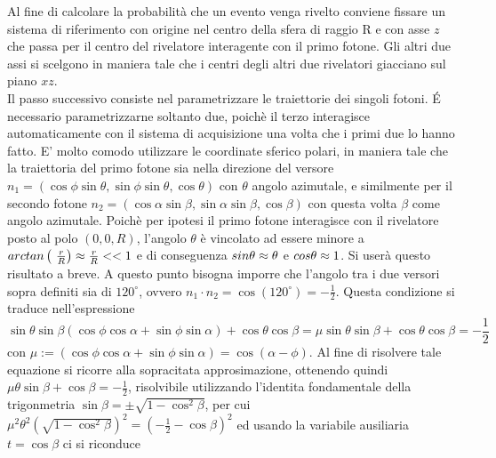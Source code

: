   Al fine di calcolare la probabilità che un evento venga rivelto conviene fissare un sistema di riferimento con origine nel centro della sfera di raggio R
  e con asse \(z\) che passa per il centro del rivelatore interagente con il primo fotone. Gli altri due assi si scelgono in maniera tale che i centri degli altri due rivelatori
  giacciano sul piano \(xz\).\\
  
  

  Il passo successivo consiste nel parametrizzare le traiettorie dei singoli fotoni. \'E necessario parametrizzarne soltanto due, poichè il terzo interagisce automaticamente con il
  sistema di acquisizione una volta che i primi due lo hanno fatto. E' molto comodo utilizzare le coordinate sferico polari, in maniera tale che la traiettoria del primo fotone sia 
  nella direzione del versore \(n_1 = \left( \cos \phi \sin \theta , \sin \phi \sin \theta, \cos \theta  \right)\) con \(\theta\) angolo azimutale, e similmente per il secondo fotone
  \(n_2 = \left( \cos \alpha \sin \beta , \sin \alpha \sin \beta, \cos \beta  \right)\) con questa volta \(\beta\) come angolo azimutale. Poichè per ipotesi il primo fotone
  interagisce con il rivelatore posto al polo \(\left(0,0,R \right)\), l'angolo \(\theta\) è vincolato ad essere minore a \(\\arctan\left(\ \frac{r}{R} \right) \approx \frac{r}{R} << 1 \)
  e di conseguenza \(\\sin \theta \approx \theta \) e \(\\cos \theta \approx 1 \). Si userà questo risultato a breve. A questo punto bisogna imporre che l'angolo tra i due versori sopra 
  definiti sia di \(120^\circ\), ovvero \(n_1 \cdot n_2 = \cos (120^\circ) = -\frac{1}{2}\). Questa condizione si traduce nell'espressione \[\sin \theta \sin \beta \left( \cos \phi \cos \alpha
  + \sin \phi \sin \alpha \right) + \cos \theta \cos \beta = \mu \sin \theta \sin \beta  + \cos \theta \cos \beta =-\frac{1}{2}\] con \(\mu := \left( \cos \phi \cos \alpha + 
  \sin \phi \sin \alpha \right) = \cos \left( \alpha - \phi \right) \). Al fine di risolvere tale equazione si ricorre alla sopracitata approsimazione, ottenendo quindi 
  \( \mu \theta \sin \beta + \cos \beta = -\frac{1}{2}\), risolvibile utilizzando l'identita fondamentale della trigonmetria \(\sin \beta = \pm \sqrt{1 - \cos^2 \beta}\), per cui
  \(\mu^2 \theta^2 \left( \sqrt{ 1 - \cos^2 \beta } \right)^2 = \left( -\frac{1}{2} - \cos \beta \right)^2  \) ed usando la variabile ausiliaria \(t = \cos \beta\) ci si riconduce 

